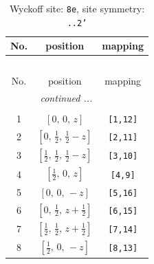 \documentclass[fleqn,8pt]{jsarticle}
\begin{document}
\renewcommand{\arraystretch}{1.2}
\begin{longtable}{ccc}
\caption{Wyckoff site: {\tt 8e}, site symmetry: {\tt ..2'}}
 \\
 \hline \hline
No. & position & mapping \\ \hline \endfirsthead

\multicolumn{2}{l}{\tablename\ \thetable{}} \\
 \hline \hline
No. & position & mapping \\ \hline \endhead

 \hline \hline
\multicolumn{2}{r}{\footnotesize\it continued ...} \\ \endfoot

 \hline \hline
\multicolumn{2}{r}{} \\ \endlastfoot

1 & $\left[ 0,\, 0,\, z \right]$ & {\tt [1,12]} \\ \hline
2 & $\left[ 0,\, \frac{1}{2},\, \frac{1}{2} - z \right]$ & {\tt [2,11]} \\ \hline
3 & $\left[ \frac{1}{2},\, \frac{1}{2},\, \frac{1}{2} - z \right]$ & {\tt [3,10]} \\ \hline
4 & $\left[ \frac{1}{2},\, 0,\, z \right]$ & {\tt [4,9]} \\ \hline
5 & $\left[ 0,\, 0,\, - z \right]$ & {\tt [5,16]} \\ \hline
6 & $\left[ 0,\, \frac{1}{2},\, z + \frac{1}{2} \right]$ & {\tt [6,15]} \\ \hline
7 & $\left[ \frac{1}{2},\, \frac{1}{2},\, z + \frac{1}{2} \right]$ & {\tt [7,14]} \\ \hline
8 & $\left[ \frac{1}{2},\, 0,\, - z \right]$ & {\tt [8,13]} \\
\end{longtable}
\renewcommand{\arraystretch}{1.2}
\end{document}
